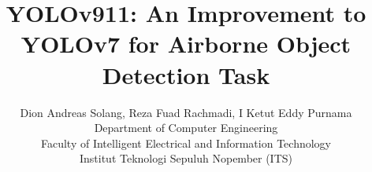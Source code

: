 \documentclass[conference]{IEEEtran}
\begin{document}
\title{YOLOv911: An Improvement to YOLOv7 for Airborne Object Detection Task\\ 
}

\author{
    Dion Andreas Solang, Reza Fuad Rachmadi, I Ketut Eddy Purnama\\
    Department of Computer Engineering\\
    Faculty of Intelligent Electrical and Information Technology\\
    Institut Teknologi Sepuluh Nopember (ITS)\\
}


\end{document}
